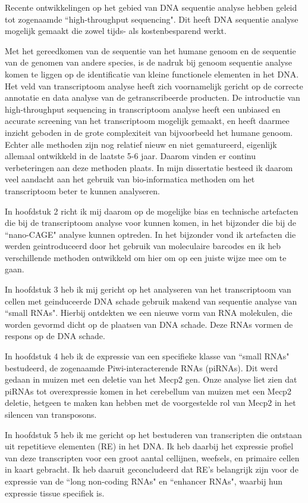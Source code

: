 Recente ontwikkelingen op het gebied van DNA sequentie analyse hebben geleid tot zogenaamde ``high-throughput sequencing". Dit heeft DNA sequentie analyse mogelijk gemaakt die zowel tijds- als kostenbesparend werkt.

Met het gereedkomen van de sequentie van het humane genoom en de sequentie van de genomen van andere species, is de nadruk bij genoom sequentie analyse komen te liggen op de identificatie van kleine functionele elementen in het DNA.  Het veld van transcriptoom analyse heeft zich voornamelijk gericht op de correcte annotatie en data analyse van de getranscribeerde producten. De introductie van high-throughput sequencing in transcriptoom analyse heeft een unbiased en accurate screening van het transcriptoom mogelijk gemaakt, en heeft daarmee inzicht geboden in de grote complexiteit van bijvoorbeeld het humane genoom. Echter alle methoden zijn nog relatief nieuw en niet gematureerd, eigenlijk allemaal ontwikkeld in de laatste 5-6 jaar. Daarom vinden er continu verbeteringen aan deze methoden plaats. In mijn dissertatie besteed ik daarom veel aandacht aan het gebruik van bio-informatica methoden om het transcriptoom beter te kunnen analyseren.

In hoofdstuk 2 richt ik mij daarom op de mogelijke bias en technische artefacten  die bij de transcriptoom analyse voor kunnen komen, in het bijzonder die bij de ``nano-CAGE" analyse kunnen optreden. In het bijzonder vond ik artefacten die werden geintroduceerd door het gebruik van moleculaire barcodes en ik heb verschillende methoden ontwikkeld om hier om op een juiste wijze mee om te gaan.

In hoofdstuk 3 heb ik mij gericht op het analyseren van het transcriptoom van cellen met geinduceerde DNA schade gebruik makend van sequentie analyse van ``small RNAs". Hierbij ontdekten we een nieuwe vorm van RNA molekulen, die worden gevormd dicht op de plaatsen van DNA schade. Deze RNAs vormen de respons op de DNA schade.

In hoofdstuk 4 heb ik de expressie van een specifieke klasse van ``small RNAs" bestudeerd, de zogenaamde Piwi-interacterende RNAs (piRNAs). Dit werd gedaan in muizen met een deletie van het Mecp2 gen. Onze analyse liet zien dat piRNAs tot overexpressie komen in het cerebellum van muizen met een Mecp2 deletie, hetgeen te maken kan hebben met de voorgestelde rol van Mecp2 in het silencen van transposons.

In hoofdstuk 5 heb ik me gericht op het bestuderen van transcripten die ontstaan uit repetitieve elementen (RE) in het DNA. Ik heb daarbij het expressie profiel van deze transcripten voor een groot aantal cellijnen, weefsels, en primaire cellen in kaart gebracht. Ik heb daaruit geconcludeerd dat RE's belangrijk zijn voor de expressie van de ``long non-coding RNAs" en ``enhancer RNAs", waarbij hun expressie tissue specifiek is.

